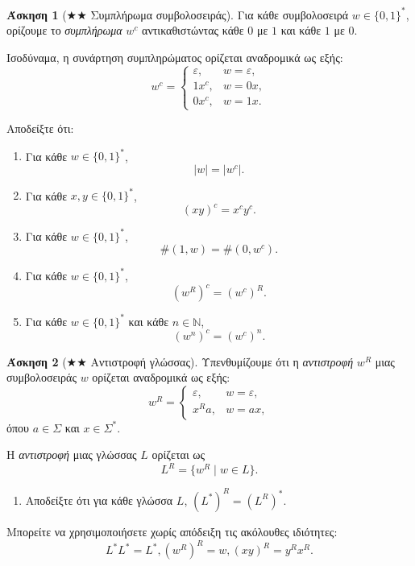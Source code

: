 \documentclass[11pt,a4paper]{article}
\newcommand{\eps}{\varepsilon}
\theoremstyle{definition}
\newtheorem{question}{Άσκηση}
\begin{document}
\begin{question}[$\bigstar\bigstar$ Συμπλήρωμα συμβολοσειράς]
Για κάθε συμβολοσειρά $w\in\{0,1\}^*$, ορίζουμε το \emph{συμπλήρωμα}
$w^c$ αντικαθιστώντας κάθε $0$ με $1$ και κάθε $1$ με $0$.

Ισοδύναμα, η συνάρτηση συμπληρώματος ορίζεται αναδρομικά ως εξής:
\[
w^c=
\begin{cases}
\eps, & w=\eps,\\
1x^c, & w=0x,\\
0x^c, & w=1x.
\end{cases}
\]

Αποδείξτε ότι:

\begin{enumerate}
\item Για κάθε $w\in\{0,1\}^*$,
\[
|w|=|w^c|.
\]

\item Για κάθε $x,y\in\{0,1\}^*$,
\[
(xy)^c=x^cy^c.
\]

\item Για κάθε $w\in\{0,1\}^*$,
\[
\#(1,w)=\#(0,w^c).
\]

\item Για κάθε $w\in\{0,1\}^*$,
\[
(w^R)^c=(w^c)^R.
\]

\item Για κάθε $w\in\{0,1\}^*$ και κάθε $n\in\mathbb N$,
\[
(w^n)^c=(w^c)^n.
\]
\end{enumerate}
\end{question}
 

\begin{question}[$\bigstar\bigstar$ Αντιστροφή γλώσσας]
Υπενθυμίζουμε ότι η \emph{αντιστροφή} $w^R$ μιας συμβολοσειράς $w$
ορίζεται αναδρομικά ως εξής:
\[
w^R=
\begin{cases}
\eps, & w=\eps,\\
x^R a, & w=ax,
\end{cases}
\]
όπου $a\in\Sigma$ και $x\in\Sigma^*$.

Η \emph{αντιστροφή} μιας γλώσσας $L$ ορίζεται ως
\[
L^R=\{w^R\mid w\in L\}.
\]

\begin{enumerate}
\item[] Αποδείξτε ότι για κάθε γλώσσα $L$,
$ 
(L^*)^R=(L^R)^*.$

\end{enumerate}

Μπορείτε να χρησιμοποιήσετε χωρίς απόδειξη τις ακόλουθες ιδιότητες:
\[
L^*L^*=L^*, (w^R)^R=w,(xy)^R=y^Rx^R.
\]
\end{question}
 
\end{document}
